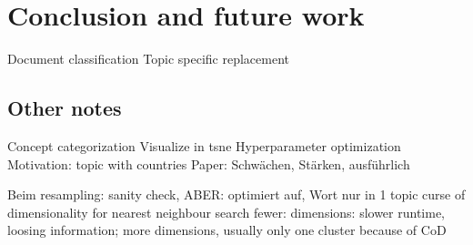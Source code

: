 \documentclass[
        a4paper,
        titlepage,
        twoside,
        parskip
        ]{scrbook}
\theoremstyle{break}
\begin{document}
\chapter{Conclusion and future work}

Document classification
Topic specific replacement
\section{Other notes}
Concept categorization
Visualize in tsne
Hyperparameter optimization
Motivation: topic with countries
Paper: Schwächen, Stärken, ausführlich

Beim resampling: sanity check, ABER: optimiert auf, Wort nur in 1 topic
curse of dimensionality for nearest neighbour search
fewer: dimensions: slower runtime, loosing information; more dimensions, usually only one cluster because of CoD

\clearpage


%
\end{document}

